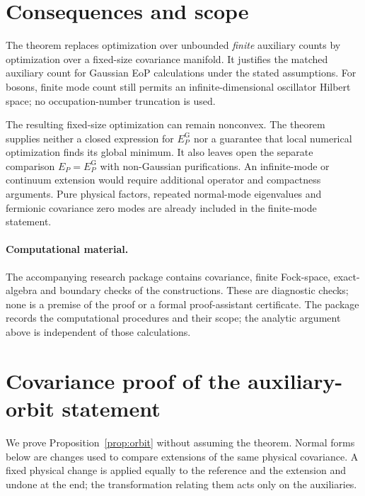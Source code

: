 \documentclass[11pt,a4paper]{article}
\numberwithin{equation}{section}
\theoremstyle{remark}
\newcommand{\EPG}{E_P^{\mathrm G}}
\begin{document}
\section{Consequences and scope}\label{sec:scope}
The theorem replaces optimization over unbounded \emph{finite} auxiliary counts by optimization over a fixed-size covariance manifold. It justifies the matched auxiliary count for Gaussian EoP calculations under the stated assumptions. For bosons, finite mode count still permits an infinite-dimensional oscillator Hilbert space; no occupation-number truncation is used.

The resulting fixed-size optimization can remain nonconvex. The theorem supplies neither a closed expression for $\EPG$ nor a guarantee that local numerical optimization finds its global minimum. It also leaves open the separate comparison $E_P=\EPG$ with non-Gaussian purifications. An infinite-mode or continuum extension would require additional operator and compactness arguments. Pure physical factors, repeated normal-mode eigenvalues and fermionic covariance zero modes are already included in the finite-mode statement.

\paragraph{Computational material.}
The accompanying research package contains covariance, finite Fock-space, exact-algebra and boundary checks of the constructions. These are diagnostic checks; none is a premise of the proof or a formal proof-assistant certificate. The package records the computational procedures and their scope; the analytic argument above is independent of those calculations.

\appendix
\section{Covariance proof of the auxiliary-orbit statement}\label{app:orbits}
We prove Proposition~\ref{prop:orbit} without assuming the theorem. Normal forms below are changes used to compare extensions of the same physical covariance. A fixed physical change is applied equally to the reference and the extension and undone at the end; the transformation relating them acts only on the auxiliaries.
\end{document}

